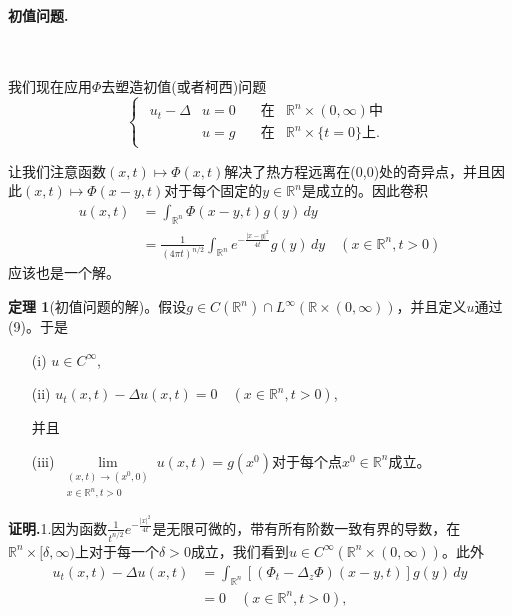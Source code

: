 \documentclass[leqno]{article}
\numberwithin{equation}{subsection}%
\begin{document}
\paragraph{初值问题.}~{}
\par
我们现在应用$\Phi$去塑造初值(或者柯西)问题 
\begin{equation}
\begin{cases}
\begin{aligned}
u_{t}-\Delta&u=0\quad&\text{在}&\mathbb{R}^{n}\times(0,\infty)\text{中}\\
&u=g&\text{在}&\mathbb{R}^{n}\times\{t=0\}\text{上}.
\end{aligned}
\end{cases}
\end{equation}
\par
让我们注意函数$(x,t)\mapsto\Phi(x,t)$解决了热方程远离在(0,0)处的奇异点，并且因此$(x,t)\mapsto\Phi(x-y,t)$对于每个固定的$y\in\mathbb{R}^{n}$是成立的。因此卷积
\begin{equation}
\begin{aligned}
u(x,t)&=\int_{\mathbb{R}^{n}}\Phi(x-y,t)g(y)\,dy\\
&=\frac{1}{(4\pi t)^{n/2}}\int_{\mathbb{R}^{n}}e^{-\frac{|x-y|^{2}}{4t}}g(y)\,dy\quad(x\in\mathbb{R}^{n},t>0)
\end{aligned}
\end{equation}
应该也是一个解。
\par
\noindent\textbf{定理 1}(初值问题的解)。假设$g\in C(\mathbb{R}^{n})\cap L^{\infty}(\mathbb{R}\times(0,\infty))$，并且定义$u$通过(9)。于是
\begin{enumerate}
	\item[(i)]$u\in C^{\infty}$,
	\item[(ii)]$u_{t}(x,t)-\Delta u(x,t)=0\quad(x\in\mathbb{R}^{n},t>0)$,
	\par
	\noindent 并且\vspace{-2ex}
	\item[(iii)]
	 $\lim\limits_{\substack{(x,t)\rightarrow(x^{0},0)\\ x\in\mathbb{R}^{n},t>0}}u(x,t)=g(x^{0}) $对于每个点$x^{0}\in\mathbb{R}^{n}$成立。
\end{enumerate}
\par
\noindent\textbf{证明.}1.因为函数$\frac{1}{t^{n/2}}e^{-\frac{|x|^{2}}{4t}}$是无限可微的，带有所有阶数一致有界的导数，在$\mathbb{R}^{n}\times[\delta,\infty)$上对于每一个$\delta>0$成立，我们看到$u\in C^{\infty}(\mathbb{R}^{n}\times (0,\infty))$。此外
\begin{equation}
\begin{aligned}
u_{t}(x,t)-\Delta u(x,t)&=\int_{\mathbb{R}^{n}}[(\Phi_{t}-\Delta_{z}\Phi)(x-y,t)]g(y)\,dy\\
&=0\quad(x\in\mathbb{R}^{n},t>0),
\end{aligned}
\end{equation}
\end{document}
